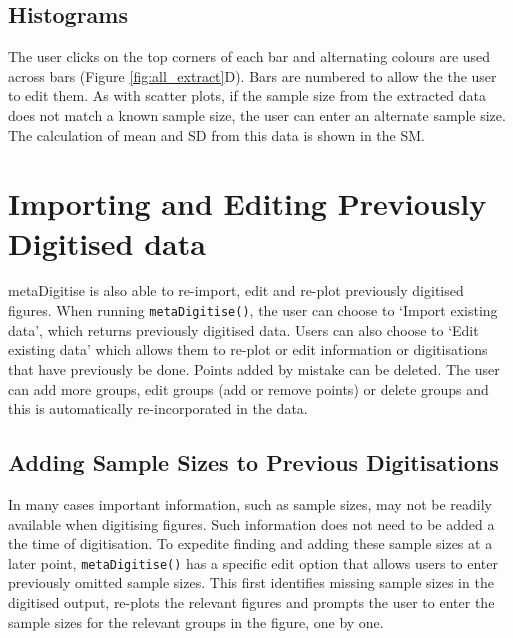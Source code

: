 \documentclass[12pt]{article}
\newcommand{\fct}[1]{\texttt{#1()}}
\newcommand{\pkg}[1]{{\fontseries{b}\selectfont #1}}
\begin{document}
\subsection{Histograms}
The user clicks on the top corners of each bar and alternating colours are used across bars (Figure \ref{fig:all_extract}D). Bars are numbered to allow the the user to edit them. As with scatter plots, if the sample size from the extracted data does not match a known sample size, the user can enter an alternate sample size. The calculation of mean and SD from this data is shown in the SM.




\section{Importing and Editing Previously Digitised data}
\pkg{metaDigitise} is also able to re-import, edit and re-plot previously digitised figures. When running \fct{metaDigitise}, the user can choose to `Import existing data', which returns previously digitised data. Users can also choose to `Edit existing data' which allows them to re-plot or edit information or digitisations that have previously be done. Points added by mistake can be deleted. The user can add more groups, edit groups (add or remove points) or delete groups and this is automatically re-incorporated in the data.

\subsection{Adding Sample Sizes to Previous Digitisations}
In many cases important information, such as sample sizes, may not be readily available when digitising figures. Such information does not need to be added a the time of digitisation. To expedite finding and adding these sample sizes at a later point, \fct{metaDigitise} has a specific edit option that allows users to enter previously omitted sample sizes. This first identifies missing sample sizes in the digitised output, re-plots the relevant figures and prompts the user to enter the sample sizes for the relevant groups in the figure, one by one. 




\end{document}
